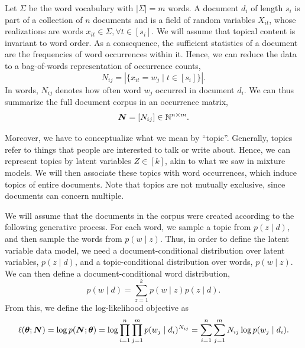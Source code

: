 Let $\Sigma$ be the word vocabulary with $|\Sigma|=m$ words. A document $d_i$ of length $s_i$ is
part of a collection of $n$ documents and is a field of random variables $X_{it}$, whose
realizations are words $x_{it} \in \Sigma, \forall t \in [s_i]$. We will assume that topical
content is invariant to word order. As a consequence, the sufficient statistics of a document are the frequencies of word
occurrences within it. Hence, we can reduce the data to a bag-of-words representation of occurrence
counts, \[
    N_{ij} = | \{ x_{it} = w_j \mid t \in [s_i] \} |.
\]
In words, $N_{ij}$ denotes how often word $w_j$ occurred in document $d_i$. We can thus summarize
the full document corpus in an occurrence matrix, \[
    \bm{N} = [N_{ij}] \in \mathbb{N}^{n \times m}.
\]

Moreover, we have to conceptualize what we mean by ``topic''. Generally, topics refer to things
that people are interested to talk or write about. Hence, we can represent topics by latent
variables $Z \in [k]$, akin to what we saw in mixture models. We will then associate these topics
with word occurrences, which induce topics of entire documents. Note that topics are not mutually exclusive, since documents can concern multiple.

We will assume that the documents in the corpus were created according to the following generative
process. For each word, we sample a topic from $p(z
    \mid d)$, and then sample the words from $p(w \mid z)$. Thus, in order to define the latent
variable data model, we need a document-conditional distribution over latent variables, $p(z \mid
    d)$, and a topic-conditional distribution over words, $p(w \mid z)$. We can then define a
document-conditional word distribution, \[
    p(w \mid d) = \sum_{z=1}^{k} p(w \mid z) p(z \mid d).
\]
From this, we define the log-likelihood objective as \[
    \ell(\bm{\theta}; \bm{N}) = \log p(\bm{N}; \bm{\theta}) = \log \prod_{i=1}^n \prod_{j=1}^{m} p(w_j \mid d_i)^{N_{ij}} = \sum_{i=1}^{n} \sum_{j=1}^{m} N_{ij} \log p(w_j \mid d_i).
\]

